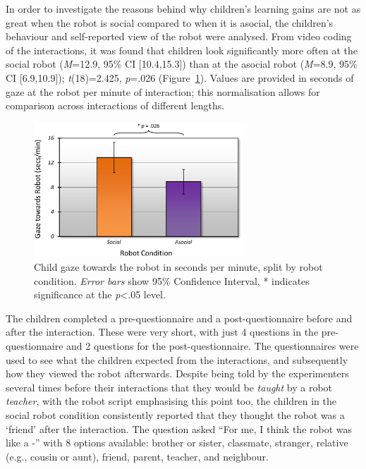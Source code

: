 In order to investigate the reasons behind why children's \gls{learning} gains are not as great when the robot is social compared to when it is asocial, the children's behaviour and self-reported view of the robot were analysed. From video coding of the interactions, it was found that children look significantly more often at the social robot (\textit{M}=12.9, 95\% CI [10.4,15.3]) than at the asocial robot (\textit{M}=8.9, 95\% CI [6.9,10.9]); \textit{t}(18)=2.425, \textit{p}=.026 (Figure~\ref{fig:ch7_gazeatrobot}). Values are provided in seconds of gaze at the robot per minute of interaction; this normalisation allows for comparison across interactions of different lengths.

\begin{figure}[t!]
    \centering
    \includegraphics[width=0.7\textwidth]{images/ch7_gaze_at_robot.pdf}
    \caption{Child gaze towards the robot in seconds per minute, split by robot condition. \textit{Error bars} show 95\% Confidence Interval, * indicates significance at the \textit{p}\textless .05 level.}
    \label{fig:ch7_gazeatrobot}
\end{figure}

The children completed a pre-questionnaire and a post-questionnaire before and after the interaction. These were very short, with just 4 questions in the pre-questionnaire and 2 questions for the post-questionnaire. The questionnaires were used to see what the children expected from the interactions, and subsequently how they viewed the robot afterwards. Despite being told by the experimenters several times before their interactions that they would be \textit{taught} by a robot \textit{teacher}, with the robot script emphasising this point too, the children in the social robot condition consistently reported that they thought the robot was a `friend' after the interaction. The question asked ``For me, I think the robot was like a -'' with 8 options available: brother or sister, classmate, stranger, relative (e.g., cousin or aunt), friend, parent, teacher, and neighbour.

